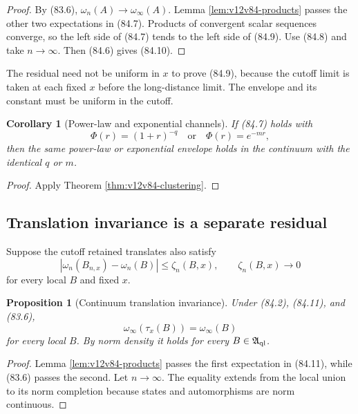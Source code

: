 \documentclass[11pt]{article}
\newtheorem{proposition}[theorem]{Proposition}
\newtheorem{corollary}[theorem]{Corollary}
\theoremstyle{remark}
\begin{document}
\begin{proof}
By (83.6), \(\omega_n(A)\to\omega_\infty(A)\).
Lemma \ref{lem:v12v84-products} passes the other two expectations in
(84.7).  Products of convergent scalar sequences converge, so the
left side of (84.7) tends to the left side of (84.9).  Use (84.8)
and take \(n\to\infty\).  Then (84.6) gives (84.10).
\end{proof}

The residual need not be uniform in \(x\) to prove (84.9), because
the cutoff limit is taken at each fixed \(x\) before the
long-distance limit.  The envelope and its constant must be uniform
in the cutoff.

\begin{corollary}[Power-law and exponential channels]
\label{cor:v12v84-rates}
If (84.7) holds with
\[
 \Phi(r)=(1+r)^{-q}
 \quad\text{or}\quad
 \Phi(r)=e^{-mr},
\]
then the same power-law or exponential envelope holds in the
continuum with the identical \(q\) or \(m\).
\end{corollary}

\begin{proof}
Apply Theorem \ref{thm:v12v84-clustering}.
\end{proof}

\subsection{Translation invariance is a separate residual}

Suppose the cutoff retained translates also satisfy
\begin{equation}
 |\omega_n(B_{n,x})-\omega_n(B)|
 \leq\zeta_n(B,x),\qquad
 \zeta_n(B,x)\longrightarrow0                               \tag{84.11}
\end{equation}
for every local \(B\) and fixed \(x\).

\begin{proposition}[Continuum translation invariance]
\label{prop:v12v84-invariance}
Under (84.2), (84.11), and (83.6),
\begin{equation}
                         \omega_\infty(\tau_x(B))
                         =\omega_\infty(B)                   \tag{84.12}
\end{equation}
for every local \(B\).  By norm density it holds for every
\(B\in{\mathfrak A}_{\rm ql}\).
\end{proposition}

\begin{proof}
Lemma \ref{lem:v12v84-products} passes the first expectation in
(84.11), while (83.6) passes the second.  Let \(n\to\infty\).
The equality extends from the local union to its norm completion
because states and automorphisms are norm continuous.
\end{proof}
\end{document}
